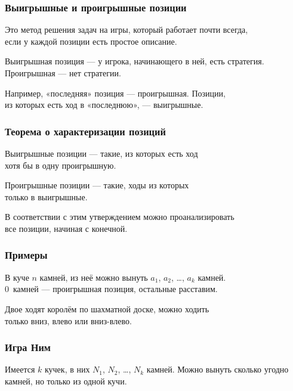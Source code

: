 \begin{frame} \frametitle{Выигрышные и проигрышные позиции}
Это метод решения задач на игры, который работает почти всегда, \\
если у каждой позиции есть простое описание. \bigskip

Выигрышная позиция — у игрока, начинающего в ней, есть стратегия. \\
Проигрышная — нет стратегии. \bigskip

Например, «последняя» позиция — проигрышная. Позиции, \\
из которых есть ход в «последнюю», — выигрышные.
\end{frame}

\begin{frame} \frametitle{Теорема о характеризации позиций}
Выигрышные позиции — такие, из которых есть ход \\
хотя бы в одну проигрышную. \bigskip

Проигрышные позиции — такие, ходы из которых \\
только в выигрышные. \bigskip

В соответствии с этим утверждением можно проанализировать \\
все позиции, начиная с конечной.
\end{frame}

\begin{frame} \frametitle{Примеры}
В куче $n$ камней, из неё можно вынуть $a_1$, $a_2$, \ldots, $a_k$ камней. \\
0~камней — проигрышная позиция, остальные расставим. \pause

Двое ходят королём по шахматной доске, можно ходить \\
только вниз, влево или вниз-влево. \pause

\begin{center}  \end{center}
\end{frame}

\begin{frame} \frametitle{Игра Ним}
	Имеется $k$ кучек, в них $N_1$, $N_2$, \ldots, $N_k$ камней. Можно вынуть сколько угодно камней, но только из одной кучи. \medskip

\begin{center} \end{center}
\end{frame}


